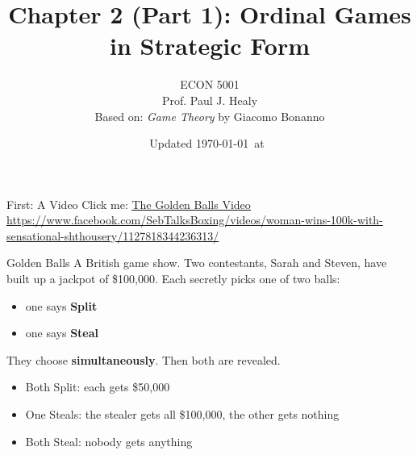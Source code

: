 

\title[Ordinal Games]{Chapter 2 (Part 1): Ordinal Games in Strategic Form}
\author[ECON 5001]{ECON 5001\\Prof. Paul J. Healy\\Based on: \textit{Game Theory} by Giacomo Bonanno} \color{metrop}
\institute[OSU]{}
\date[]{\vfill {\tiny Updated \today\ at\ \DTMcurrenttime}}



\frame{\maketitle}

\begin{frame}{First: A Video}
\vfill
\centering
Click me: \uline{\href{https://www.facebook.com/SebTalksBoxing/videos/woman-wins-100k-with-sensational-shthousery/1127818344236313/}{The Golden Balls Video}}
\bsk
\tiny{\url{https://www.facebook.com/SebTalksBoxing/videos/woman-wins-100k-with-sensational-shthousery/1127818344236313/}}
\vfill
\end{frame}


\begin{frame}{Golden Balls}
A British game show. Two contestants, Sarah and Steven, have built up a jackpot of \$100,000.
\bsk
Each secretly picks one of two balls:
\begin{itemize}
    \item one says \textbf{Split}
    \item one says \textbf{Steal}
\end{itemize}
They choose \textbf{simultaneously}. Then both are revealed.
\bsk
\begin{itemize}
    \item Both Split: \hspace{0.2in} each gets \$50,000
    \item One Steals: \hspace{0.14in} the stealer gets all \$100,000, the other gets nothing
    \item Both Steal: \hspace{0.19in} nobody gets anything
\end{itemize}
\vspace{-0.5in}
\end{frame}

